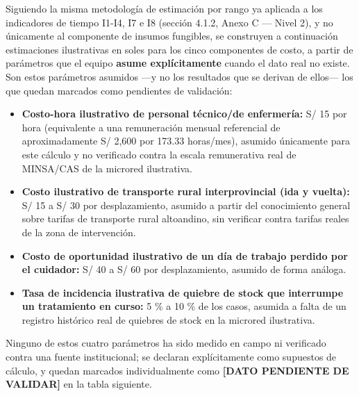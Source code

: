 \documentclass[11pt,a4paper]{article}
\providecommand{\tightlist}{%
  \setlength{\itemsep}{0pt}\setlength{\parskip}{0pt}}
\begin{document}
Siguiendo la misma metodología de estimación por rango ya aplicada a los indicadores de tiempo I1-I4, I7 e I8 (sección 4.1.2, Anexo C --- Nivel 2), y no únicamente al componente de insumos fungibles, se construyen a continuación estimaciones ilustrativas en soles para los cinco componentes de costo, a partir de parámetros que el equipo \textbf{asume explícitamente} cuando el dato real no existe. Son estos parámetros asumidos ---y no los resultados que se derivan de ellos--- los que quedan marcados como pendientes de validación:

\begin{itemize}
\tightlist
\item
  \textbf{Costo-hora ilustrativo de personal técnico/de enfermería:} S/ 15 por hora (equivalente a una remuneración mensual referencial de aproximadamente S/ 2,600 por 173.33 horas/mes), asumido únicamente para este cálculo y no verificado contra la escala remunerativa real de MINSA/CAS de la microred ilustrativa.
\item
  \textbf{Costo ilustrativo de transporte rural interprovincial (ida y vuelta):} S/ 15 a S/ 30 por desplazamiento, asumido a partir del conocimiento general sobre tarifas de transporte rural altoandino, sin verificar contra tarifas reales de la zona de intervención.
\item
  \textbf{Costo de oportunidad ilustrativo de un día de trabajo perdido por el cuidador:} S/ 40 a S/ 60 por desplazamiento, asumido de forma análoga.
\item
  \textbf{Tasa de incidencia ilustrativa de quiebre de stock que interrumpe un tratamiento en curso:} 5 \% a 10 \% de los casos, asumida a falta de un registro histórico real de quiebres de stock en la microred ilustrativa.
\end{itemize}

Ninguno de estos cuatro parámetros ha sido medido en campo ni verificado contra una fuente institucional; se declaran explícitamente como supuestos de cálculo, y quedan marcados individualmente como \textbf{{[}DATO PENDIENTE DE VALIDAR{]}} en la tabla siguiente.
\end{document}
